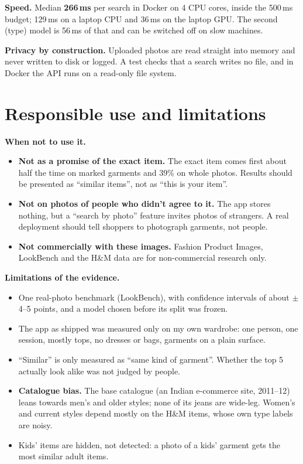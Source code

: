 \documentclass[11pt,a4paper]{article}
\begin{document}
\textbf{Speed.} Median \textbf{266\,ms} per search in Docker on 4 CPU cores, inside the 500\,ms budget;
129\,ms on a laptop CPU and 36\,ms on the laptop GPU. The second (type) model is 56\,ms of that and can be
switched off on slow machines.

\textbf{Privacy by construction.} Uploaded photos are read straight into memory and never written to disk or
logged. A test checks that a search writes no file, and in Docker the API runs on a read-only file system.

\section{Responsible use and limitations}

\textbf{When not to use it.}
\begin{itemize}
\item \textbf{Not as a promise of the exact item.} The exact item comes first about half the time on marked
  garments and 39\% on whole photos. Results should be presented as ``similar items'', not as ``this is your
  item''.
\item \textbf{Not on photos of people who didn't agree to it.} The app stores nothing, but a ``search by
  photo'' feature invites photos of strangers. A real deployment should tell shoppers to photograph garments,
  not people.
\item \textbf{Not commercially with these images.} Fashion Product Images, LookBench and the H\&M data are for
  non-commercial research only.
\end{itemize}

\textbf{Limitations of the evidence.}
\begin{itemize}
\item One real-photo benchmark (LookBench), with confidence intervals of about $\pm$4--5 points, and a model
  chosen before its split was frozen.
\item The app as shipped was measured only on my own wardrobe: one person, one session, mostly tops, no
  dresses or bags, garments on a plain surface.
\item ``Similar'' is only measured as ``same kind of garment''. Whether the top 5 actually look alike was not
  judged by people.
\item \textbf{Catalogue bias.} The base catalogue (an Indian e-commerce site, 2011--12) leans towards men's
  and older styles; none of its jeans are wide-leg. Women's and current styles depend mostly on the H\&M
  items, whose own type labels are noisy.
\item Kids' items are hidden, not detected: a photo of a kids' garment gets the most similar adult items.
\end{itemize}
\end{document}
